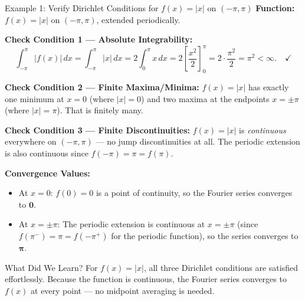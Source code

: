 \documentclass[12pt,a4paper]{article}
\begin{document}
\begin{infobox}{Example 1: Verify Dirichlet Conditions for $f(x)=|x|$ on $(-\pi,\pi)$}
\textbf{Function:} $f(x) = |x|$ on $(-\pi,\pi)$, extended periodically.

\medskip
\textbf{Check Condition 1 --- Absolute Integrability:}
\[
   \int_{-\pi}^{\pi} |f(x)|\,dx = \int_{-\pi}^{\pi} |x|\,dx = 2\int_0^{\pi} x\,dx = 2\left[\frac{x^2}{2}\right]_0^{\pi} = 2 \cdot \frac{\pi^2}{2} = \pi^2 < \infty. \quad \checkmark
\]

\textbf{Check Condition 2 --- Finite Maxima/Minima:}
$f(x)=|x|$ has exactly one minimum at $x=0$ (where $|x|=0$) and two maxima at the endpoints $x=\pm\pi$ (where $|x|=\pi$). That is finitely many. \checkmark

\textbf{Check Condition 3 --- Finite Discontinuities:}
$f(x)=|x|$ is \emph{continuous} everywhere on $(-\pi,\pi)$ --- no jump discontinuities at all. The periodic extension is also continuous since $f(-\pi)=\pi=f(\pi)$. \checkmark

\medskip
\textbf{Convergence Values:}
\begin{itemize}[noitemsep]
   \item At $x=0$: $f(0)=0$ is a point of continuity, so the Fourier series converges to $\mathbf{0}$.
   \item At $x=\pm\pi$: The periodic extension is continuous at $x=\pm\pi$ (since $f(\pi^-)=\pi=f(-\pi^+)$ for the periodic function), so the series converges to $\boldsymbol{\pi}$.
\end{itemize}
\end{infobox}

\begin{learnbox}{What Did We Learn?}
For $f(x)=|x|$, all three Dirichlet conditions are satisfied effortlessly. Because the function is continuous, the Fourier series converges to $f(x)$ at every point --- no midpoint averaging is needed.
\end{learnbox}

\bigskip
\end{document}
